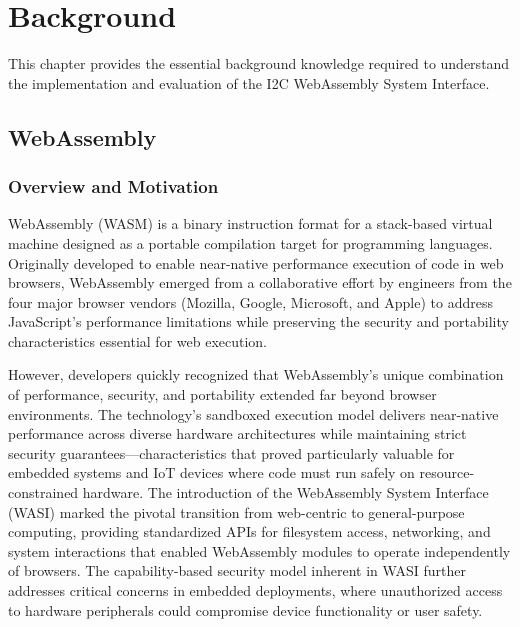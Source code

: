 \chapter{Background}
\label{chap:background}

This chapter provides the essential background knowledge required to understand the implementation and evaluation of the I2C WebAssembly System Interface.

\section{WebAssembly}
\label{sec:webassembly}

\subsection{Overview and Motivation}
\label{subsec:wasm-overview}

WebAssembly (WASM) is a binary instruction format for a stack-based virtual machine designed as a portable compilation target for programming languages\cite{rossberg2018webassembly}. Originally developed to enable near-native performance execution of code in web browsers, WebAssembly emerged from a collaborative effort by engineers from the four major browser vendors (Mozilla, Google, Microsoft, and Apple) to address JavaScript's performance limitations while preserving the security and portability characteristics essential for web execution.

However, developers quickly recognized that WebAssembly's unique combination of performance, security, and portability extended far beyond browser environments. The technology's sandboxed execution model delivers near-native performance across diverse hardware architectures while maintaining strict security guarantees—characteristics that proved particularly valuable for embedded systems and IoT devices where code must run safely on resource-constrained hardware. The introduction of the WebAssembly System Interface (WASI) marked the pivotal transition from web-centric to general-purpose computing, providing standardized APIs for filesystem access, networking, and system interactions that enabled WebAssembly modules to operate independently of browsers. The capability-based security model inherent in WASI further addresses critical concerns in embedded deployments, where unauthorized access to hardware peripherals could compromise device functionality or user safety.

